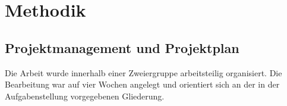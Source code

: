 

\chapter{Methodik}
\label{Chapter2}


\section{Projektmanagement und Projektplan}
\label{sec:projektmanagement}

Die Arbeit wurde innerhalb einer Zweiergruppe arbeitsteilig organisiert. Die Bearbeitung war auf vier Wochen
angelegt und orientiert sich an der in der Aufgabenstellung vorgegebenen Gliederung.

